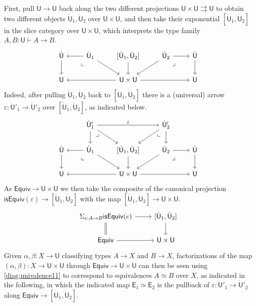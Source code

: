 \documentclass[12pt,reqno]{amsart}
\renewcommand{\to}{\ensuremath{\rightarrow}}
\newcommand{\tto}{\ensuremath{\rightrightarrows}}
\newcommand{\T}{\ensuremath{\mathsf{U}}}
\newcommand{\TT}{\ensuremath{\dot{\mathsf{U}}}}
\newcommand{\pbcorner}{\arrow[dr,phantom,"\lrcorner" very near start, shift right=.5ex]} %
\newcommand{\pbcornerright}{\arrow[dl,phantom,"\llcorner" very near start, shift left=.5ex]} %
\theoremstyle{remark}
\theoremstyle{definition}
\begin{document}
First, pull $\TT \to \T$ back along the two different projections $\T \times \T \tto \T$ to obtain two different objects $\TT_1, \TT_2$ over $\T \times \T$, and then take their exponential $[\TT_1, \TT_2]$ in the slice category over ${\T \times \T}$, which interprets the type family $A, B : \T \vdash A \to B$.
\begin{equation*}\label{diag:univalence1}
\begin{tikzcd} 
	\TT \ar[d] & \TT_1 \ar[l] \ar[rd] \pbcornerright &\ar[d] [\TT_1, \TT_2] & \TT_2 \ar[ld] \ar[r] \pbcorner & \TT \ar[d] \\  
	\T && \ar[ll]  \T \times \T \ar[rr] && \T
	 \end{tikzcd}
 \end{equation*}
 Indeed, after pulling $\TT_1, \TT_2$ back to $[\TT_1, \TT_2]$ there is a (universal) arrow $\varepsilon : \TT'_1 \to \TT'_2$ over $[\TT_1, \TT_2]$, as indicated below.
 \begin{equation}\label{diag:univalence11}
\begin{tikzcd} 
& \TT'_1  \ar[d] \arrow[dr,phantom,"\lrcorner" very near start, shift right=1.5ex] \ar[rd] \ar[rr,"\varepsilon"] 
	&& \TT'_2 \ar[ld]  \arrow[dl,phantom,"\llcorner" very near start, shift left=1.5ex] \ar[d] & \\  
	\TT \ar[d] & \TT_1 \ar[l] \ar[rd] \pbcornerright &\ar[d] [\TT_1, \TT_2]& \TT_2 \ar[ld] \ar[r] \pbcorner & \TT \ar[d] \\  
	\T && \ar[ll]  \T \times \T \ar[rr] && \T
	 \end{tikzcd}
 \end{equation}
%
As $\mathsf{Equiv} \to \T \times \T$ we then take the composite of the canonical projection $\mathsf{isEquiv}(\varepsilon) \to [\TT_1, \TT_2]$ with the map $[\TT_1, \TT_2] \to  \T \times \T$.
%
\begin{equation*}\label{diag:univalence2}
\begin{tikzcd} 
{\Sigma_{e : A\to B}\mathsf{isEquiv}(e)}  \ar[d, equals] \ar[r] & {[\TT_1, \TT_2]}  \ar[d]\\
\mathsf{Equiv} \ar[r] &  \T \times \T
 \end{tikzcd}
 \end{equation*}
%
Given $\alpha, \beta : X \to \T$ classifying types $A\to X$ and $B \to X$, factorizations of the map $(\alpha, \beta) : X \to \T \times \T $ through $\mathsf{Equiv} \to \T \times \T$ can then be seen using \eqref{diag:univalence11}  to correspond to equivalences $A\simeq B$ over $X$, as indicated in the following, in which the indicated map $\mathsf{E}_1\simeq\mathsf{E}_2$ is the pullback of  $\varepsilon : \TT'_1\to \TT'_2$ along $\mathsf{Equiv}\to {[\TT_1, \TT_2]}$.
\end{document}
